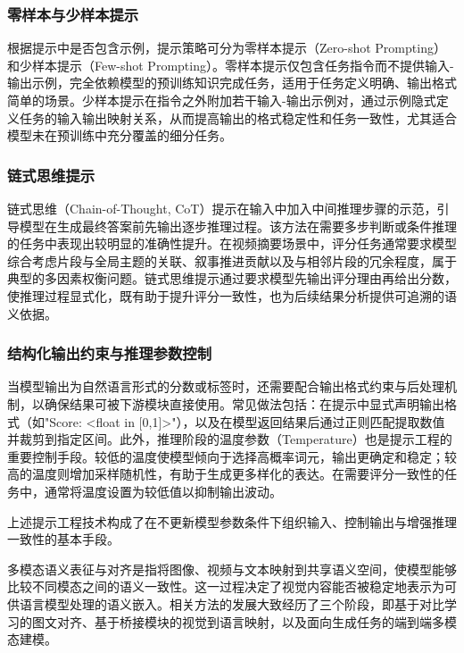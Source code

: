 \subsubsection{零样本与少样本提示}
根据提示中是否包含示例，提示策略可分为零样本提示（Zero-shot Prompting）和少样本提示（Few-shot Prompting）\cite{brown2020language}。零样本提示仅包含任务指令而不提供输入-输出示例，完全依赖模型的预训练知识完成任务，适用于任务定义明确、输出格式简单的场景。少样本提示在指令之外附加若干输入-输出示例对，通过示例隐式定义任务的输入输出映射关系，从而提高输出的格式稳定性和任务一致性，尤其适合模型未在预训练中充分覆盖的细分任务。

\subsubsection{链式思维提示}
链式思维（Chain-of-Thought, CoT）提示\cite{wei2022chain}在输入中加入中间推理步骤的示范，引导模型在生成最终答案前先输出逐步推理过程。该方法在需要多步判断或条件推理的任务中表现出较明显的准确性提升。在视频摘要场景中，评分任务通常要求模型综合考虑片段与全局主题的关联、叙事推进贡献以及与相邻片段的冗余程度，属于典型的多因素权衡问题。链式思维提示通过要求模型先输出评分理由再给出分数，使推理过程显式化，既有助于提升评分一致性，也为后续结果分析提供可追溯的语义依据。

\subsubsection{结构化输出约束与推理参数控制}
当模型输出为自然语言形式的分数或标签时，还需要配合输出格式约束与后处理机制，以确保结果可被下游模块直接使用。常见做法包括：在提示中显式声明输出格式（如"Score: <float in [0,1]>"），以及在模型返回结果后通过正则匹配提取数值并裁剪到指定区间。此外，推理阶段的温度参数（Temperature）也是提示工程的重要控制手段。较低的温度使模型倾向于选择高概率词元，输出更确定和稳定；较高的温度则增加采样随机性，有助于生成更多样化的表达。在需要评分一致性的任务中，通常将温度设置为较低值以抑制输出波动。

上述提示工程技术构成了在不更新模型参数条件下组织输入、控制输出与增强推理一致性的基本手段。


多模态语义表征与对齐是指将图像、视频与文本映射到共享语义空间，使模型能够比较不同模态之间的语义一致性。这一过程决定了视觉内容能否被稳定地表示为可供语言模型处理的语义嵌入。相关方法的发展大致经历了三个阶段，即基于对比学习的图文对齐、基于桥接模块的视觉到语言映射，以及面向生成任务的端到端多模态建模。


